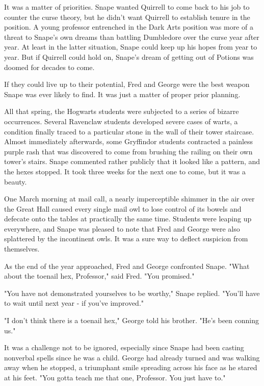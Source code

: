 It was a matter of priorities. Snape wanted Quirrell to come back to his job to counter the curse theory, but he didn't want Quirrell to establish tenure in the position. A young professor entrenched in the Dark Arts position was more of a threat to Snape's own dreams than battling Dumbledore over the curse year after year. At least in the latter situation, Snape could keep up his hopes from year to year. But if Quirrell could hold on, Snape's dream of getting out of Potions was doomed for decades to come.

If they could live up to their potential, Fred and George were the best weapon Snape was ever likely to find. It was just a matter of proper prior planning.

All that spring, the Hogwarts students were subjected to a series of bizarre occurrences. Several Ravenclaw students developed severe cases of warts, a condition finally traced to a particular stone in the wall of their tower staircase. Almost immediately afterwards, some Gryffindor students contracted a painless purple rash that was discovered to come from brushing the railing on their own tower's stairs. Snape commented rather publicly that it looked like a pattern, and the hexes stopped. It took three weeks for the next one to come, but it was a beauty.

One March morning at mail call, a nearly imperceptible shimmer in the air over the Great Hall caused every single mail owl to lose control of its bowels and defecate onto the tables at practically the same time. Students were leaping up everywhere, and Snape was pleased to note that Fred and George were also splattered by the incontinent owls. It was a sure way to deflect suspicion from themselves.

As the end of the year approached, Fred and George confronted Snape. "What about the toenail hex, Professor," said Fred. "You promised."

"You have not demonstrated yourselves to be worthy," Snape replied. "You'll have to wait until next year - if you've improved."

"I don't think there is a toenail hex," George told his brother. "He's been conning us."

It was a challenge not to be ignored, especially since Snape had been casting nonverbal spells since he was a child. George had already turned and was walking away when he stopped, a triumphant smile spreading across his face as he stared at his feet. "You gotta teach me that one, Professor. You just have to."

